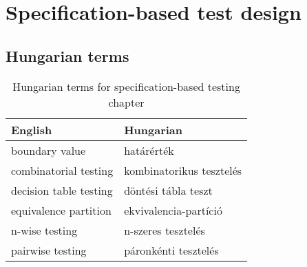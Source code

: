 \chapter{Specification-based test design}


\section{Hungarian terms}

\begin{table}[ht]
    \centering
    \small
    \caption{Hungarian terms for specification-based testing chapter}
    \begin{tabular}{ll}
        \toprule
        \textbf{English} & \textbf{Hungarian} \\
        \midrule
        boundary value & határérték \\
        combinatorial testing & kombinatorikus tesztelés \\
        decision table testing & döntési tábla teszt \\
        equivalence partition & ekvivalencia-partíció \\
        n-wise testing & n-szeres tesztelés \\
        pairwise testing & páronkénti tesztelés \\
        \bottomrule
    \end{tabular}
    \label{tab:overview:hungarian-terms-testing-specification}
\end{table} 